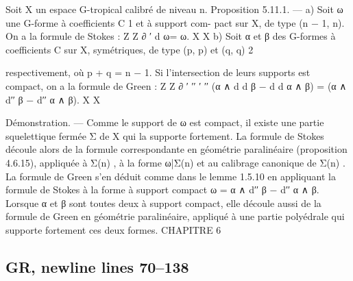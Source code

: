 \documentclass[
  10pt,
]{article}
\newenvironment{Shaded}{}{}
\newcommand{\NormalTok}[1]{#1}
\begin{document}
\begin{Shaded}
\begin{Highlighting}[]
\NormalTok{  Soit X un espace G{-}tropical calibré de niveau n.}
\NormalTok{Proposition 5.11.1. — a) Soit ω une G{-}forme à coefficients C 1 et à support com{-}}
\NormalTok{pact sur X, de type (n − 1, n). On a la formule de Stokes :}
\NormalTok{                                   Z         Z ∂}
\NormalTok{                                        ′}
\NormalTok{                                       d ω=      ω.}
\NormalTok{                                      X                X}
\NormalTok{   b) Soit α et β des G{-}formes à coefficients C sur X, symétriques, de type (p, p) et (q, q)}
\NormalTok{                                                   2}

\NormalTok{respectivement, où p + q = n − 1. Si l’intersection de leurs supports est compact, on a la}
\NormalTok{formule de Green :}
\NormalTok{                 Z                               Z ∂}
\NormalTok{                          ′ ′′     ′ ′′}
\NormalTok{                    (α ∧ d d β − d d α ∧ β) =        (α ∧ d′′ β − d′′ α ∧ β).}
\NormalTok{                  X                                    X}

\NormalTok{Démonstration. — Comme le support de ω est compact, il existe une partie squelettique}
\NormalTok{fermée Σ de X qui la supporte fortement. La formule de Stokes découle alors de la}
\NormalTok{formule correspondante en géométrie paralinéaire (proposition 4.6.15), appliquée à Σ(n) ,}
\NormalTok{à la forme ω|Σ(n) et au calibrage canonique de Σ(n) .}
\NormalTok{   La formule de Green s’en déduit comme dans le lemme 1.5.10 en appliquant la formule}
\NormalTok{de Stokes à la forme à support compact ω = α ∧ d′′ β − d′′ α ∧ β. Lorsque α et β sont}
\NormalTok{toutes deux à support compact, elle découle aussi de la formule de Green en géométrie}
\NormalTok{paralinéaire, appliqué à une partie polyédrale qui supporte fortement ces deux formes.}
\NormalTok{CHAPITRE 6}
\end{Highlighting}
\end{Shaded}

\subsection{GR, newline lines 70--138}\label{gr-newline-lines-70138}
\end{document}
